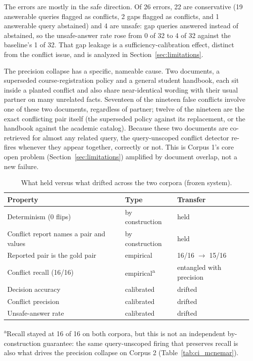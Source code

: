 \documentclass[conference]{IEEEtran}
\begin{document}
The errors are mostly in the safe direction. Of 26 errors, 22 are conservative
(19 answerable queries flagged as conflicts, 2 gaps flagged as conflicts, and
1 answerable query abstained) and 4 are unsafe: gap queries answered instead
of abstained, so the unsafe-answer rate rose from 0 of 32 to 4 of 32 against
the baseline's 1 of 32. That gap leakage is a sufficiency-calibration effect,
distinct from the conflict issue, and is analyzed in
Section~\ref{sec:limitations}.

The precision collapse has a specific, nameable cause. Two documents, a
superseded course-registration policy and a general student handbook, each
sit inside a planted conflict and also share near-identical wording with
their usual partner on many unrelated facts. Seventeen of the nineteen false
conflicts involve one of these two documents, regardless of partner; twelve
of the nineteen are the exact conflicting pair itself (the superseded policy
against its replacement, or the handbook against the academic catalog).
Because these two documents are co-retrieved for almost any related query,
the query-unscoped conflict detector re-fires whenever they appear together,
correctly or not. This is Corpus 1's core open problem
(Section~\ref{sec:limitations}) amplified by document overlap, not a new
failure.

\begin{table}[htbp]
\caption{What held versus what drifted across the two corpora (frozen system).}
\label{tab:heldvsdrifted}
\centering
\small
\begin{tabularx}{\columnwidth}{@{}X l l@{}}
\toprule
Property & Type & Transfer \\
\midrule
Determinism (0 flips)          & by construction & held \\
Conflict report names a pair and values & by construction & held \\
Reported pair is the gold pair & empirical & 16/16 $\to$ 15/16 \\
Conflict recall (16/16)        & empirical\textsuperscript{a} & entangled with precision \\
Decision accuracy              & calibrated      & drifted \\
Conflict precision             & calibrated      & drifted \\
Unsafe-answer rate             & calibrated      & drifted \\
\bottomrule
\end{tabularx}

\vspace{3pt}
\raggedright\scriptsize
\textsuperscript{a}Recall stayed at 16 of 16 on both corpora, but this is
not an independent by-construction guarantee: the same query-unscoped
firing that preserves recall is also what drives the precision collapse on
Corpus 2 (Table~\ref{tab:ci_mcnemar}).
\end{table}
\end{document}
